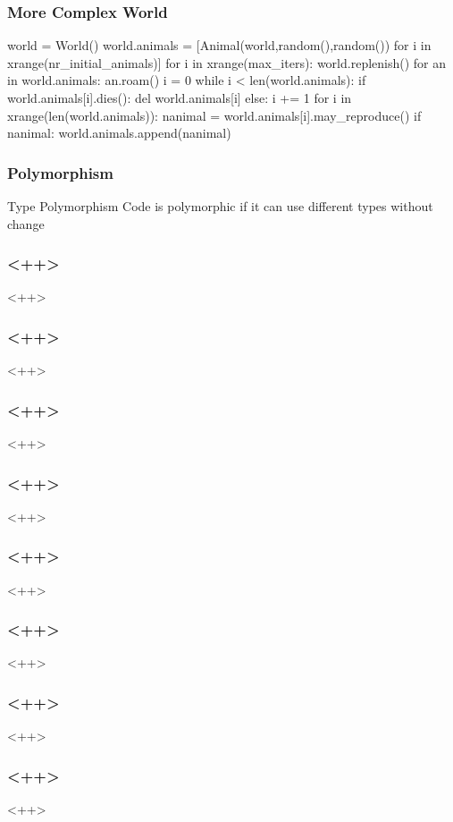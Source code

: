 \begin{frame}[fragile] 
\frametitle{More Complex World}

\begin{python}
world = World()
world.animals = [Animal(world,random(),random())
                for i in xrange(nr_initial_animals)]
for i in xrange(max_iters):
    world.replenish()
    for an in world.animals: an.roam()
    i = 0
    while i < len(world.animals):
        if world.animals[i].dies():
            del world.animals[i]
        else: i += 1
    for i in xrange(len(world.animals)):
        nanimal = world.animals[i].may_reproduce()
        if nanimal:
            world.animals.append(nanimal)
\end{python}
\end{frame}

\begin{frame}[fragile] 
\frametitle{Polymorphism}

\begin{block}{Type Polymorphism}
Code is \alert{polymorphic} if it can use different types without change
\end{block}
\end{frame}

\begin{frame}[fragile] 
\frametitle{<++>}
<++>
\end{frame}

\begin{frame}[fragile] 
\frametitle{<++>}
<++>
\end{frame}

\begin{frame}[fragile] 
\frametitle{<++>}
<++>
\end{frame}

\begin{frame}[fragile] 
\frametitle{<++>}
<++>
\end{frame}

\begin{frame}[fragile] 
\frametitle{<++>}
<++>
\end{frame}

\begin{frame}[fragile] 
\frametitle{<++>}
<++>
\end{frame}

\begin{frame}[fragile] 
\frametitle{<++>}
<++>
\end{frame}

\begin{frame}[fragile] 
\frametitle{<++>}
<++>
\end{frame}

